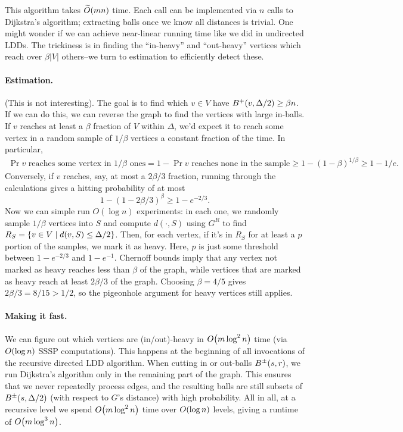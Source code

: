 \documentclass[12pt]{article}
\begin{document}
This algorithm takes $\apxO{mn}$ time. Each call can be implemented via $n$
calls to Dijkstra's algorithm; extracting balls once we know all distances is
trivial. One might wonder if we can achieve near-linear running time like we did
in undirected LDDs. The trickiness is in finding the ``in-heavy'' and
``out-heavy'' vertices which reach over $\beta|V|$ others--we turn to estimation
to efficiently detect these.

{\color{gray}
  \paragraph{Estimation.}

  (This is not interesting). The goal is to find which $v \in V$ have
  $\outball{v, \Delta/2} \geq \beta n$. If we can do this, we can reverse the
  graph to
  find the vertices with large in-balls. If $v$ reaches at least a $\beta$
  fraction of $V$ within $\Delta$, we'd expect it to reach some vertex in a
  random
  sample of $1/\beta$ vertices a constant fraction of the time. In particular,
  \begin{align*}
    \Pr{\text{$v$ reaches some vertex in $1/\beta$ ones}}
    =    1 - \Pr{\text{$v$ reaches none in the sample}}
    \geq 1 - (1 - \beta)^{1/\beta}
    \geq 1 - 1/e.
  \end{align*}
  Conversely, if $v$ reaches, say, at most a $2\beta/3$ fraction, running
  through
  the calculations gives a hitting probability of at most
  \[
    1 - (1 - 2\beta/3)^\beta \geq 1 - e^{-2/3}.
  \]
  Now we can simple run $O(\log n)$ experiments: in each one, we randomly
  sample
  $1/\beta$ vertices into $S$ and compute $d(\cdot, S)$ using $G^R$ to find
  $R_S = \Set{v \in V \mid d(v, S) \leq \Delta/2}$. Then, for each vertex, if
  it's
  in $R_S$ for at least a $p$ portion of the samples, we mark it as heavy.
  Here,
  $p$ is just some threshold between $1 - e^{-2/3}$ and $1 - e^{-1}$. Chernoff
  bounds imply that any vertex not marked as heavy reaches less than $\beta$
  of
  the graph, while vertices that are marked as heavy reach at least $2\beta/3$
  of
  the graph. Choosing $\beta = 4/5$ gives $2\beta/3 = 8/15 > 1/2$, so the
  pigeonhole argument for heavy vertices still applies.
}

\paragraph{Making it fast.}

We can figure out which vertices are (in/out)-heavy in $\bigO{m\log^2n}$ time
(via $\bigO{\log n}$ SSSP computations). This happens at the beginning of all
invocations of the recursive directed LDD algorithm. When cutting in or
out-balls $\inoutball{s, r}$, we run Dijkstra's algorithm only in the remaining
part of the graph. This ensures that we never repeatedly process edges, and the
resulting balls are still subsets of $\inoutball{s, \Delta/2}$ (with respect to
$G$'s distance) with high probability. All in all, at a recursive level we spend
$\bigO{m\log^2n}$ time over $\bigO{ \log n }$ levels, giving a runtime of
$\bigO{m\log^3 n}$.
\end{document}

